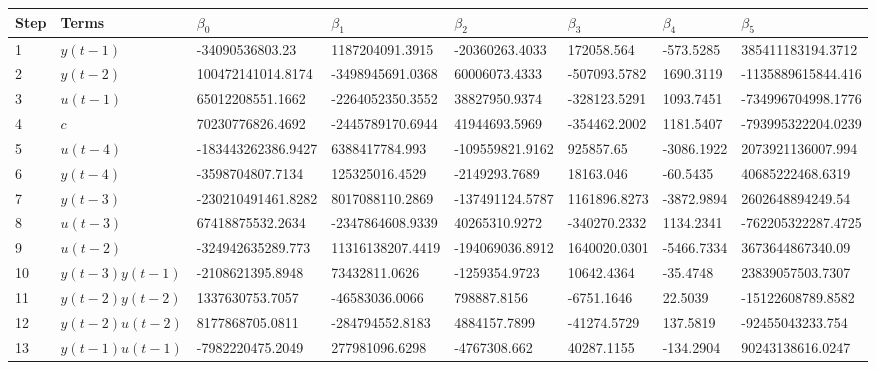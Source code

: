 \begin{tabular}{llllllll}
Step & Terms & $\beta_{0}$ & $\beta_{1}$ & $\beta_{2}$ & $\beta_{3}$ & $\beta_{4}$ & $\beta_{5}$ \\ 
\hline 
1 & $y(t-1)$ & -34090536803.23 & 1187204091.3915 & -20360263.4033 & 172058.564 & -573.5285 & 385411183194.3712 \\ 
2 & $y(t-2)$ & 100472141014.8174 & -3498945691.0368 & 60006073.4333 & -507093.5782 & 1690.3119 & -1135889615844.416 \\ 
3 & $u(t-1)$ & 65012208551.1662 & -2264052350.3552 & 38827950.9374 & -328123.5291 & 1093.7451 & -734996704998.1776 \\ 
4 & $c$ & 70230776826.4692 & -2445789170.6944 & 41944693.5969 & -354462.2002 & 1181.5407 & -793995322204.0239 \\ 
5 & $u(t-4)$ & -183443262386.9427 & 6388417784.993 & -109559821.9162 & 925857.65 & -3086.1922 & 2073921136007.994 \\ 
6 & $y(t-4)$ & -3598704807.7134 & 125325016.4529 & -2149293.7689 & 18163.046 & -60.5435 & 40685222468.6319 \\ 
7 & $y(t-3)$ & -230210491461.8282 & 8017088110.2869 & -137491124.5787 & 1161896.8273 & -3872.9894 & 2602648894249.54 \\ 
8 & $u(t-3)$ & 67418875532.2634 & -2347864608.9339 & 40265310.9272 & -340270.2332 & 1134.2341 & -762205322287.4725 \\ 
9 & $u(t-2)$ & -324942635289.773 & 11316138207.4419 & -194069036.8912 & 1640020.0301 & -5466.7334 & 3673644867340.09 \\ 
10 & $y(t-3)y(t-1)$ & -2108621395.8948 & 73432811.0626 & -1259354.9723 & 10642.4364 & -35.4748 & 23839057503.7307 \\ 
11 & $y(t-2)y(t-2)$ & 1337630753.7057 & -46583036.0066 & 798887.8156 & -6751.1646 & 22.5039 & -15122608789.8582 \\ 
12 & $y(t-2)u(t-2)$ & 8177868705.0811 & -284794552.8183 & 4884157.7899 & -41274.5729 & 137.5819 & -92455043233.754 \\ 
13 & $y(t-1)u(t-1)$ & -7982220475.2049 & 277981096.6298 & -4767308.662 & 40287.1155 & -134.2904 & 90243138616.0247 \\ 
\hline 
\end{tabular}